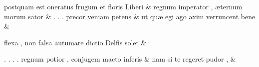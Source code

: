 \documentclass[12pt,onecolumn,twoside,a4paper]{memoir}
\begin{document}
\begin{pairs}
\begin{Leftside}
                              postquam
                              est
                              oneratus
                              frugum
                              et
                              floris
                              Liberi \&
                         \stanza {}
                     regnum
                              imperator
                              ,
                              æternum
                              morum
                              sator \&
                         \stanza {}.
                              .
                              .
                              precor
                              veniam
                              petens & 
                     ut
                              quæ
                              egi
                              ago
                              axim
                              verruncent
                              bene \&
                         \stanza {}
                     
                              flexa
                              ,
                              non
                              falsa
                              autumare
                              dictio
                              Delfis
                              solet \&
                         \stanza {}
                     
                              {
                              .
                              .
                              .
                              }
                              .
                              regnum
                              potior
                              ,
                              conjugem
                              macto
                              inferis \&
                         \stanza {}nam
                              si
                              te
                              regeret
                              pudor
                              , & 
                     

\end{Leftside}
\end{pairs}
\end{document}
